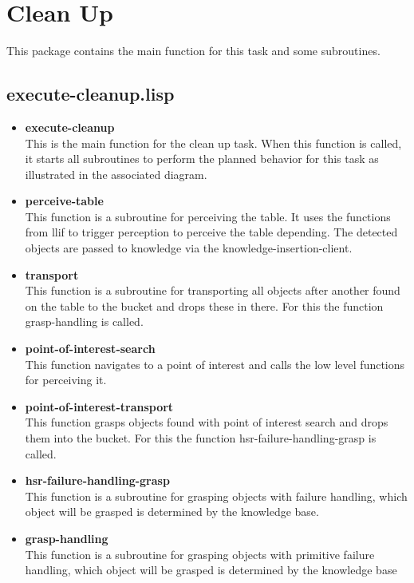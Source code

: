 \documentclass[main.tex]{subfiles}
\begin{document}
	  	\section{Clean Up}
	  	\label{clean}
	  	This package contains the main function for this task and some subroutines.
	  	\subsection{execute-cleanup.lisp}
	  	\begin{itemize}
			\item \textbf{execute-cleanup} \\
			This is the main function for the clean up task. When this function is called, it starts all subroutines to perform the planned behavior for this task as illustrated in the associated diagram.
			\item \textbf{perceive-table} \\
			This function is a subroutine for perceiving the table. It uses the functions from llif to trigger perception to perceive the table depending. The detected objects are passed to knowledge via the knowledge-insertion-client.
			\item \textbf{transport} \\
            This function is a subroutine for transporting all objects after another found on the table to the bucket and drops these in there. For this the function grasp-handling is called.
			\item \textbf{point-of-interest-search} \\
			This function navigates to a point of interest and calls the low level functions for perceiving it. 
			\item \textbf{point-of-interest-transport} \\
			This function grasps objects found with point of interest search and drops them into the bucket. For this the function hsr-failure-handling-grasp is called.
			\item \textbf{hsr-failure-handling-grasp} \\
			This function is a subroutine for grasping objects with failure handling, which object will be grasped is determined by the knowledge base.
			\item \textbf{grasp-handling}\\
			This function is a subroutine for grasping objects with primitive failure handling, which object will be grasped is determined by the knowledge base
		\end{itemize}
\end{document}
